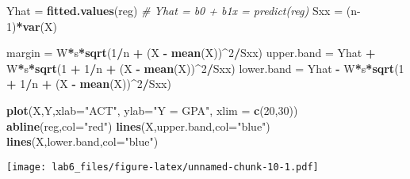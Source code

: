\documentclass[
]{article}
\newenvironment{Shaded}{\begin{snugshade}}{\end{snugshade}}
\newcommand{\CommentTok}[1]{\textcolor[rgb]{0.56,0.35,0.01}{\textit{#1}}}
\newcommand{\DataTypeTok}[1]{\textcolor[rgb]{0.13,0.29,0.53}{#1}}
\newcommand{\DecValTok}[1]{\textcolor[rgb]{0.00,0.00,0.81}{#1}}
\newcommand{\KeywordTok}[1]{\textcolor[rgb]{0.13,0.29,0.53}{\textbf{#1}}}
\newcommand{\NormalTok}[1]{#1}
\newcommand{\OperatorTok}[1]{\textcolor[rgb]{0.81,0.36,0.00}{\textbf{#1}}}
\newcommand{\StringTok}[1]{\textcolor[rgb]{0.31,0.60,0.02}{#1}}
\begin{document}
\begin{Shaded}
\begin{Highlighting}[]
\NormalTok{Yhat =}\StringTok{ }\KeywordTok{fitted.values}\NormalTok{(reg) }\CommentTok{# Yhat = b0 + b1x = predict(reg)}
\NormalTok{Sxx =}\StringTok{ }\NormalTok{(n}\DecValTok{-1}\NormalTok{)}\OperatorTok{*}\KeywordTok{var}\NormalTok{(X) }

\NormalTok{margin =}\StringTok{ }\NormalTok{W}\OperatorTok{*}\NormalTok{s}\OperatorTok{*}\KeywordTok{sqrt}\NormalTok{(}\DecValTok{1}\OperatorTok{/}\NormalTok{n }\OperatorTok{+}\StringTok{ }\NormalTok{(X }\OperatorTok{-}\StringTok{ }\KeywordTok{mean}\NormalTok{(X))}\OperatorTok{^}\DecValTok{2}\OperatorTok{/}\NormalTok{Sxx) }
\NormalTok{upper.band =}\StringTok{ }\NormalTok{Yhat }\OperatorTok{+}\StringTok{ }\NormalTok{W}\OperatorTok{*}\NormalTok{s}\OperatorTok{*}\KeywordTok{sqrt}\NormalTok{(}\DecValTok{1} \OperatorTok{+}\StringTok{ }\DecValTok{1}\OperatorTok{/}\NormalTok{n }\OperatorTok{+}\StringTok{ }\NormalTok{(X }\OperatorTok{-}\StringTok{ }\KeywordTok{mean}\NormalTok{(X))}\OperatorTok{^}\DecValTok{2}\OperatorTok{/}\NormalTok{Sxx) }
\NormalTok{lower.band =}\StringTok{ }\NormalTok{Yhat }\OperatorTok{-}\StringTok{ }\NormalTok{W}\OperatorTok{*}\NormalTok{s}\OperatorTok{*}\KeywordTok{sqrt}\NormalTok{(}\DecValTok{1} \OperatorTok{+}\StringTok{ }\DecValTok{1}\OperatorTok{/}\NormalTok{n }\OperatorTok{+}\StringTok{ }\NormalTok{(X }\OperatorTok{-}\StringTok{ }\KeywordTok{mean}\NormalTok{(X))}\OperatorTok{^}\DecValTok{2}\OperatorTok{/}\NormalTok{Sxx) }

\KeywordTok{plot}\NormalTok{(X,Y,}\DataTypeTok{xlab=}\StringTok{"ACT"}\NormalTok{, }\DataTypeTok{ylab=}\StringTok{"Y = GPA"}\NormalTok{, }\DataTypeTok{xlim =} \KeywordTok{c}\NormalTok{(}\DecValTok{20}\NormalTok{,}\DecValTok{30}\NormalTok{))}
\KeywordTok{abline}\NormalTok{(reg,}\DataTypeTok{col=}\StringTok{"red"}\NormalTok{)}
\KeywordTok{lines}\NormalTok{(X,upper.band,}\DataTypeTok{col=}\StringTok{"blue"}\NormalTok{)}
\KeywordTok{lines}\NormalTok{(X,lower.band,}\DataTypeTok{col=}\StringTok{"blue"}\NormalTok{)}
\end{Highlighting}
\end{Shaded}

\texttt{[image: lab6\_files/figure-latex/unnamed-chunk-10-1.pdf]}
\end{document}
